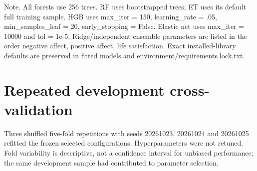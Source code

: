 \documentclass[11pt,letterpaper]{article}
\begin{document}
\nopagebreak

Note. All forests use 256 trees. RF uses bootstrapped trees; ET uses its default full training sample. HGB uses max\_\allowbreak{}iter = 150, learning\_\allowbreak{}rate = .05, min\_\allowbreak{}samples\_\allowbreak{}leaf = 20, early\_\allowbreak{}stopping = False. Elastic net uses max\_\allowbreak{}iter = 10000 and tol = 1e-5. Ridge/independent ensemble parameters are listed in the order negative affect, positive affect, life satisfaction. Exact installed-library defaults are preserved in fitted models and environment/requirements.lock.txt.

\endgroup

\section{Repeated development cross-validation}\label{repeated-development-cross-validation}

Three shuffled five-fold repetitions with seeds 20261023, 20261024 and 20261025 refitted the frozen selected configurations. Hyperparameters were not retuned. Fold variability is descriptive, not a confidence interval for unbiased performance; the same development sample had contributed to parameter selection.

\begingroup\singlespacing\fontsize{10}{12}\selectfont\setlength{\parindent}{0pt}
\end{document}
